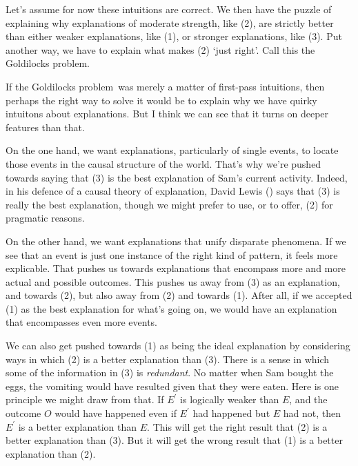 \documentclass[
  11pt,
  letterpaper,
  DIV=11,
  numbers=noendperiod,
  oneside]{scrartcl}
\begin{document}
Let's assume for now these intuitions are correct. We then have the
puzzle of explaining why explanations of moderate strength, like (2),
are strictly better than either weaker explanations, like (1), or
stronger explanations, like (3). Put another way, we have to explain
what makes (2) `just right'. Call this the Goldilocks
problem.

If the Goldilocks problem~was merely a matter of first-pass intuitions,
then perhaps the right way to solve it would be to explain why we have
quirky intuitons about explanations. But I think we can see that it
turns on deeper features than that.

On the one hand, we want explanations, particularly of single events, to
locate those events in the causal structure of the world. That's why
we're pushed towards saying that (3) is the best explanation of Sam's
current activity. Indeed, in his defence of a causal theory of
explanation, David Lewis () says that (3)
is really the best explanation, though we might prefer to use, or to
offer, (2) for pragmatic reasons.

On the other hand, we want explanations that unify disparate phenomena.
If we see that an event is just one instance of the right kind of
pattern, it feels more explicable. That pushes us towards explanations
that encompass more and more actual and possible outcomes. This pushes
us away from (3) as an explanation, and towards (2), but also away from
(2) and towards (1). After all, if we accepted (1) as the best
explanation for what's going on, we would have an explanation that
encompasses even more events.

We can also get pushed towards (1) as being the ideal explanation by
considering ways in which (2) is a better explanation than (3). There is
a sense in which some of the information in (3) is \emph{redundant}. No
matter when Sam bought the eggs, the vomiting would have resulted given
that they were eaten. Here is one principle we might draw from that. If
\(E^\prime\) is logically weaker than \(E\), and the outcome \(O\) would
have happened even if \(E^\prime\) had happened but \(E\) had not, then
\(E^\prime\) is a better explanation than \(E\). This will get the right
result that (2) is a better explanation than (3). But it will get the
wrong result that (1) is a better explanation than (2).
\end{document}
